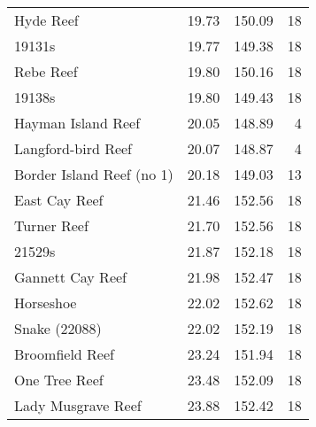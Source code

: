 \begin{table}[ht]
\begin{center}
{\begin{tabular}{lrrr}
  Hyde Reef & 19.73 & 150.09 & 18 \\ 
  19131s & 19.77 & 149.38 & 18 \\ 
  Rebe Reef & 19.80 & 150.16 & 18 \\ 
  19138s & 19.80 & 149.43 & 18 \\ 
  Hayman Island Reef & 20.05 & 148.89 & 4 \\ 
  Langford-bird Reef & 20.07 & 148.87 & 4 \\ 
  Border Island Reef (no 1) & 20.18 & 149.03 & 13 \\ 
  East Cay Reef & 21.46 & 152.56 & 18 \\ 
  Turner Reef & 21.70 & 152.56 & 18 \\ 
  21529s & 21.87 & 152.18 & 18 \\ 
  Gannett Cay Reef & 21.98 & 152.47 & 18 \\ 
  Horseshoe & 22.02 & 152.62 & 18 \\ 
  Snake (22088) & 22.02 & 152.19 & 18 \\ 
  Broomfield Reef & 23.24 & 151.94 & 18 \\ 
  One Tree Reef & 23.48 & 152.09 & 18 \\ 
  Lady Musgrave Reef & 23.88 & 152.42 & 18 \\ 
   \bottomrule
\end{tabular}
}
\end{center}
\end{table}
